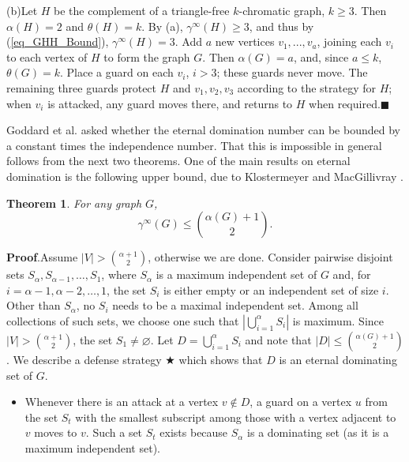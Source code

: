 \documentclass[12pt]{article}%
\newtheorem{theorem}{Theorem}[section]
\begin{document}
\bigskip

\noindent(b)\hspace{0.1in}Let $H$ be the complement of a triangle-free
$k$-chromatic graph, $k\geq3$. Then $\alpha(H)=2$ and $\theta(H)=k$. By (a),
$\gamma^{\infty}(H)\geq3$, and thus by (\ref{eq_GHH_Bound}), $\gamma^{\infty
}(H)=3$. Add $a$ new vertices $v_{1},...,v_{a}$, joining each $v_{i}$ to each
vertex of $H$ to form the graph $G$. Then $\alpha(G)=a$, and, since $a\leq k$,
$\theta(G)=k$. Place a guard on each $v_{i}$, $i>3$; these guards never move.
The remaining three guards protect $H$ and $v_{1},v_{2},v_{3}$ according to
the strategy for $H$; when $v_{i}$ is attacked, any guard moves there, and
returns to $H$ when required.\hfill$\blacksquare$

\bigskip

Goddard et al. \cite{GHH} asked whether the eternal domination number can be
bounded by a constant times the independence number. That this is impossible
in general follows from the next two theorems. One of the main results on
eternal domination is the following upper bound, due to Klostermeyer and
MacGillivray \cite{KM}.

\begin{theorem}
\label{ThmKM}\emph{\cite{KM}\hspace{0.1in}}For any graph $G$,%
\[
\gamma^{\infty}(G)\leq\binom{\alpha(G)+1}{2}.
\]

\end{theorem}

\noindent\textbf{Proof}.\hspace{0.1in}Assume $|V|>{\binom{\alpha+1}{2}}$,
otherwise we are done. Consider pairwise disjoint sets $S_{\alpha}%
,S_{\alpha-1},\ldots,S_{1}$, where $S_{\alpha}$ is a maximum independent set
of $G$ and, for $i=\alpha-1,\alpha-2,\ldots,1$, the set $S_{i}$ is either
empty or an independent set of size $i$. Other than $S_{\alpha}$, no $S_{i}$
needs to be a maximal independent set. Among all collections of such sets, we
choose one such that $|\bigcup_{i=1}^{\alpha}S_{i}|$ is maximum. Since
$|V|>{\binom{\alpha+1}{2}}$, the set $S_{1}\neq\varnothing$. Let
$D=\bigcup_{i=1}^{\alpha}S_{i}$ and note that $|D|\leq\binom{\alpha(G)+1}{2}$.
We describe a defense strategy $\bigstar$ which shows that $D$ is an eternal
dominating set of $G$.

\begin{itemize}
\item[$\bigstar$] Whenever there is an attack at a vertex $v\notin D$, a guard
on a vertex $u$ from the set $S_{t}$ with the smallest subscript among those
with a vertex adjacent to $v$ moves to $v$. Such a set $S_{t}$ exists because
$S_{\alpha}$ is a dominating set (as it is a maximum independent set).
\end{itemize}
\end{document}
